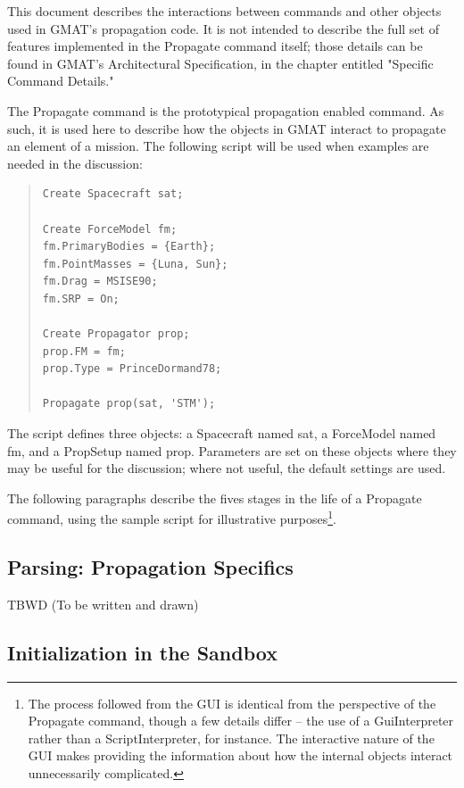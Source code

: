 \documentclass[10pt]{article}
\begin{document}
This document describes the interactions between commands and other objects used in GMAT's propagation code.  It is not intended to describe the full set of features implemented in the Propagate command itself; those details can be found in GMAT's Architectural Specification\cite{GMAT:2008}, in the chapter entitled "Specific Command Details."  

The Propagate command is the prototypical propagation enabled command.  As such, it is used here to describe how the objects in GMAT interact to propagate an element of a mission.  The following script will be used when examples are needed in the discussion:

\begin{quote}
\begin{verbatim}
Create Spacecraft sat;

Create ForceModel fm;
fm.PrimaryBodies = {Earth};
fm.PointMasses = {Luna, Sun};
fm.Drag = MSISE90;
fm.SRP = On;

Create Propagator prop;
prop.FM = fm;
prop.Type = PrinceDormand78;

Propagate prop(sat, 'STM');
\end{verbatim}
\end{quote}

\noindent The script defines three objects: a Spacecraft named sat, a ForceModel named fm, and a PropSetup named prop.  Parameters are set on these objects where they may be useful for the discussion; where not useful, the default settings are used.

The following paragraphs describe the fives stages in the life of a Propagate command, using the sample script for illustrative purposes\footnote{The process followed from the GUI is identical from the perspective of the Propagate command, though a few details differ -- the use of a GuiInterpreter rather than a ScriptInterpreter, for instance.  The interactive nature of the GUI makes providing the information about how the internal objects interact unnecessarily complicated.}.

\subsection{Parsing: Propagation Specifics}

TBWD  (To be written and drawn)

\subsection{Initialization in the Sandbox}
\end{document}
